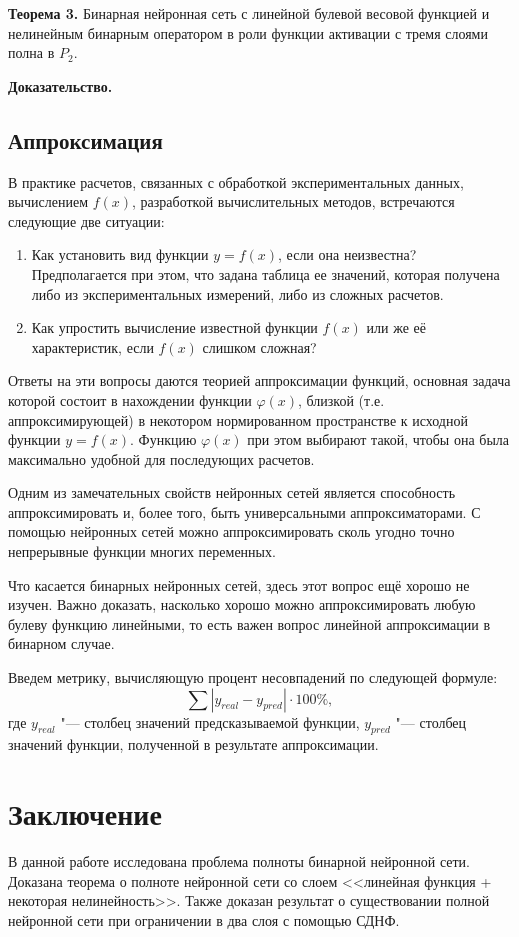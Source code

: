 \documentclass[a4paper, 14pt]{extarticle}
\begin{document}
    \textbf{Теорема 3.}
    Бинарная нейронная сеть с линейной булевой весовой функцией и нелинейным бинарным оператором в роли функции активации с тремя слоями полна в $P_2$.
    
    \textbf{Доказательство.}
    
    
\subsection{Аппроксимация}   
    В практике расчетов, связанных с обработкой экспериментальных данных, вычислением $f(x)$, разработкой вычислительных методов, встречаются следующие две ситуации:
    
    \begin{enumerate}
    \item Как установить вид функции $y = f(x)$, если она неизвестна? Предполагается при этом, что задана таблица ее значений, которая получена либо из экспериментальных измерений, либо из сложных расчетов.
    \item Как упростить вычисление известной функции $f(x)$ или же её характеристик, если $f(x)$ слишком сложная?
    \end{enumerate}
    
    Ответы на эти вопросы даются теорией аппроксимации функций, основная задача которой состоит в нахождении функции $\varphi(x)$, близкой (т.е. аппроксимирующей) в некотором нормированном пространстве к исходной функции $y = f(x)$. Функцию $\varphi(x)$ при этом выбирают такой, чтобы она была максимально удобной для последующих расчетов.
    
    Одним из замечательных свойств нейронных сетей является способность аппроксимировать и, более того, быть универсальными аппроксиматорами. С помощью нейронных сетей можно аппроксимировать сколь угодно точно непрерывные функции многих переменных.
    
    Что касается бинарных нейронных сетей, здесь этот вопрос ещё хорошо не изучен. Важно доказать, насколько хорошо можно аппроксимировать любую булеву функцию линейными, то есть важен вопрос линейной аппроксимации в бинарном случае.
    
    Введем метрику, вычисляющую процент несовпадений по следующей формуле:
    $$\sum |y_{real} - y_{pred}| \cdot 100\%,$$ где $y_{real}$ "--- столбец значений предсказываемой функции, $y_{pred}$ "--- столбец значений функции, полученной в результате аппроксимации.
    
\newpage

        
\section{Заключение}
    В данной работе исследована проблема полноты бинарной нейронной сети. Доказана теорема о полноте нейронной сети со слоем <<линейная функция + некоторая нелинейность>>. Также доказан результат о существовании полной нейронной сети при ограничении в два слоя с помощью СДНФ.
    
\end{document}
